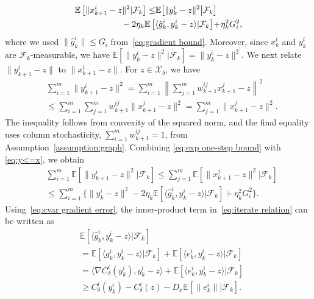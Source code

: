 \documentclass[twocolumn]{autart}    %
\newcommand{\1}{\mathbf{1}}
\begin{document}
\begin{align}\label{eq:exp one-step bound}
 \mathbb{E}\left[\|x_{k+1}^i-z\|^{2} |\mathcal{F}_k\right] \le &  \mathbb{E}\!\left[ \|y_k^i-z\|^{2}\big| \mathcal{F}_k\right]  \nonumber \\
&\hspace{-4em}  - 2 \eta_k\mathbb{E}\left[ \langle \hat{g}_k^i,y_k^i-z\rangle|\mathcal{F}_k\right]\! +\!\eta_k^{2}  G_i^2   , 
\end{align} 
where we used $\|\hat g_k^i\|\le G_i$ from~\eqref{eq:gradient bound}.
Moreover, since  $x_k^i$ and $y_k^i$ are $\mathcal{F}_k$-measurable, we have $\mathbb{E}\!\left[ \|y_k^i-z\|^{2}\big| \mathcal{F}_k\right]  = \|y_k^i-z\|^{2}$. 
We next relate $\|y_{k+1}^i-z\|$ to $\|x_{k+1}^i-z\|$. For $z \in \mathcal{X}_\delta$, we have  
\begin{align}\label{eq:y<=x}
&\sum_{i=1}^{m}\|y_{k+1}^i-z\|^{2}=\sum_{i=1}^{m}\left\|\sum_{j=1}^{m} w_{k+1}^{ij}  x_{k+1}^j-z\right\|^{2} \nonumber \\
&\leq \sum_{i=1}^{m} \sum_{j=1}^{m} w_{k+1}^{ij}\|x_{k+1}^j-z\|^{2} = \sum_{j=1}^{m}\|x_{k+1}^j-z\|^2.
\end{align}
The inequality follows from convexity of the squared norm, and the final equality uses column stochasticity, $\sum_{i=1}^m w_{k+1}^{ij}=1$, from Assumption~\ref{assumption:graph}.
Combining \eqref{eq:exp one-step bound} with \eqref{eq:y<=x}, 
we obtain 
\begin{align}\label{eq:iterate relation}
&\sum_{i=1}^m   \mathbb{E}\left[\|y_{k+1}^i-z\|^2|\mathcal{F}_k\right]   \le \sum_{j=1}^m  \mathbb{E}\left[\|x_{k+1}^j -z\|^2 |\mathcal{F}_k\right] \nonumber \\ 
&\!\le\! \sum_{i=1}^m  \Big\{   \|y_k^i-z\|^{2}    -2 \eta_k\mathbb{E}\left[ \langle \hat{g}_k^i,y_k^i-z\rangle|\mathcal{F}_k\right]  + \eta_k^{2}G_i^2\Big\}.
\end{align}
Using~\eqref{eq:cvar gradient error}, the inner-product term in~\eqref{eq:iterate relation} can be written as
\begin{align}\label{eq:Exp <g, y-z>}
&\mathbb{E}\left[ \langle \hat{g}_k^i,y_k^i-z\rangle|\mathcal{F}_k\right] \nonumber \\
& =\mathbb{E}\left[ \langle g_k^i, y_k^i-z\rangle |\mathcal{F}_k \right] +\mathbb{E}\left[ \langle e_k^i, y_k^i-z \rangle |\mathcal{F}_k \right] \nonumber \\ 
 &=  
 \langle   \nabla  C_\delta^i (y_k^i)      ,y_k^i-z\rangle   +\mathbb{E}\left[ \langle      e_k^i,y_k^i-z\rangle \big| \mathcal{F}_k \right]
  \nonumber \\ 
&\ge     C_\delta^i (y_k^i) -C_\delta^i(z)    -D_x \mathbb{E}\left[ \| e_k^i \| \big| \mathcal{F}_k\right] .
\end{align}
\end{document}
